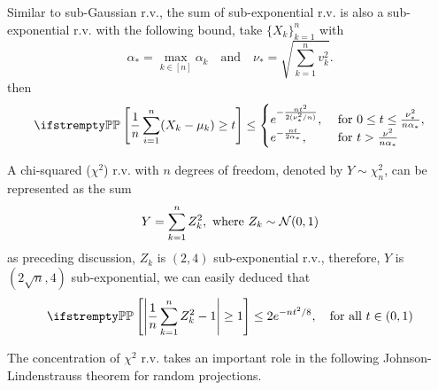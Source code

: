 \documentclass{paper}
\begin{document}
Similar to sub-Gaussian r.v., the sum of sub-exponential r.v. is also a sub-exponential r.v. with the following bound, take $\{X_k\}_{k=1}^n$ with
\[
	\alpha_* =\max_{k\in[n]}\alpha_k\quad \text{and}\quad \nu_* = \sqrt{\sum_{k=1}^{n}v_k^2}.
\]
then
\[
	\PP\left[\frac{1}{n}\sum_{i=1}^{n}(X_k-\mu_k)\geq t\right] \leq \begin{cases}
		e^{-\frac{nt^2}{2(\nu_*^2/n)}}, & \text{ for } 0\leq t\leq \frac{\nu_*^2}{n\alpha_*}, \\
		e^{-\frac{nt}{2\alpha_*}},      & \text{ for } t > \frac{\nu^2}{n\alpha_*}
	\end{cases}
\]
\begin{exmp}
	A chi-squared ($\chi^2$) r.v. with $n$ degrees of freedom, denoted by $Y\sim\chi_n^2$, can be represented as the sum
	\[
		Y = \sum_{k=1}^{n}Z_k^2, \text{ where } Z_k\sim \mathcal{N}(0, 1)
	\]
	as preceding discussion, $Z_k$ is $(2, 4)$ sub-exponential r.v., therefore, $Y$ is $(2\sqrt{n}, 4)$ sub-exponential, we can easily deduced that
	\[
		\PP\left[\left\vert \frac{1}{n}\sum_{k=1}^{n}Z_k^2-1\right\vert\geq 1\right] \leq 2e^{-nt^2/8}, \quad \text{for all } t\in(0, 1)
	\]
\end{exmp}
The concentration of $\chi^2$ r.v. takes an important role in the following Johnson-Lindenstrauss theorem for random projections.
\end{document}
